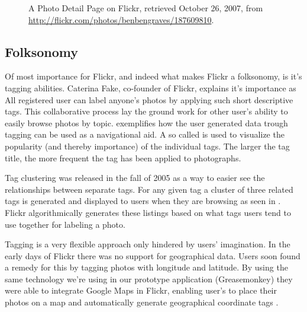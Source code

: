 \begin{figure}
\begin{whole}
\begin{minipage}[t]{0.475\wholewidth}
      \caption[Flickr Photo Detail Page]{%
         A Photo Detail Page on Flickr,
         retrieved October 26, 2007, from
         \url{http://flickr.com/photos/benbengraves/187609810}.}
      \label{figure:scrsh.flickr.photo.detail}
    \end{minipage}
  \end{whole}
  \normalcaption
\end{figure}

\subsection{Folksonomy}
Of most importance
for Flickr, and indeed what makes Flickr a folksonomy, is it's tagging
abilities. Caterina Fake, co-founder of Flickr, explains it's importance as
All registered user can label anyone's photos by applying such short
descriptive tags. This collaborative process lay the ground work for other
user's ability to easily browse photos by topic.
exemplifies how the user generated data trough tagging can be used as a
navigational aid. A so called  is used to visualize the
popularity (and thereby importance) of the individual tags. The larger the
tag title, the more frequent the tag has been applied to photographs.

Tag clustering was released in the fall of 2005 \citep{butterfield05} as a way
to easier see the relationships between separate tags. For any given tag a
cluster of three related tags is generated and displayed to users when they
are browsing as seen in
.
Flickr algorithmically generates these listings based on what tags users tend
to use together for labeling a photo.

Tagging is a very flexible approach only hindered by users' imagination. In the
early days of Flickr there was no support for geographical data. Users soon
found a remedy for this by tagging photos with longitude and latitude. By
using the same technology we're using in our prototype application
(Greasemonkey) they were able to integrate Google Maps%
 in Flickr, enabling user's to place their photos on a map and automatically
generate geographical coordinate tags%
.

